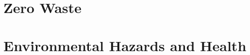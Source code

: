 \documentclass[12pt, a4paper]{article}
\begin{document}
\begin{multicols*}{3}
\section{Zero Waste}
\section{Environmental Hazards and Health}

\end{multicols*}
\end{document}

